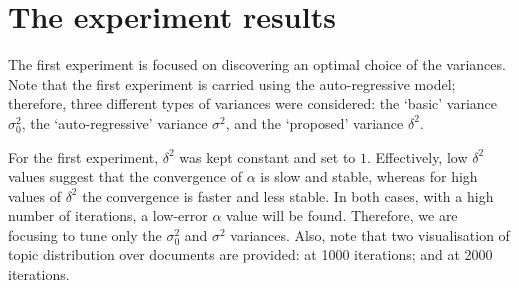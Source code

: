 \documentclass[12pt]{article}
\begin{document}
\section*{The experiment results}

\par The first experiment is focused on discovering an optimal choice of the variances. Note that the first experiment is carried using the auto-regressive model; therefore, three different types of variances were considered: the `basic' variance $\sigma^2_0$, the `auto-regressive' variance $\sigma^2$, and the `proposed' variance $\delta^2$. 

\par For the first experiment, $\delta^2$ was kept constant and set to $1$. Effectively, low $\delta^2$ values suggest that the convergence of $\alpha$ is slow and stable, whereas for high values of $\delta^2$ the convergence is faster and less stable. In both cases, with a high number of iterations, a low-error $\alpha$ value will be found. Therefore, we are focusing to tune only the $\sigma^2_0$ and $\sigma^2$ variances. Also, note that two visualisation of topic distribution over documents are provided: at 1000 iterations; and at 2000 iterations.
\end{document}
